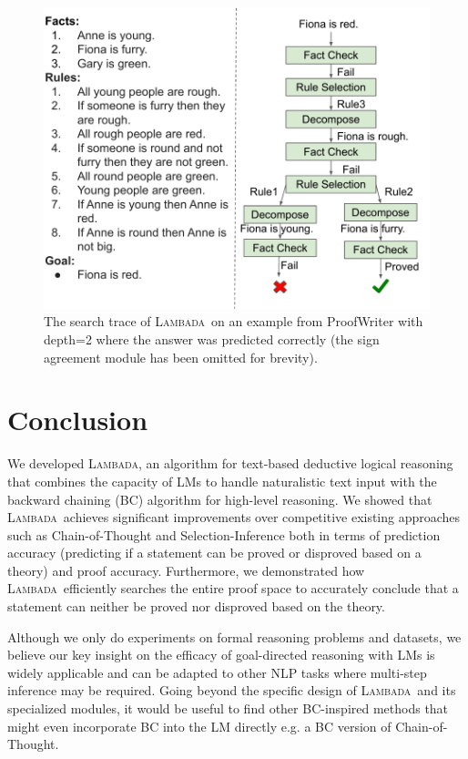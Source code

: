 \documentclass[11pt]{article}
\newcommand{\algo}{\textsc{Lambada}}
\begin{document}
\begin{figure}[t]
  \centering
  \includegraphics[width=\columnwidth]{success1.pdf}
  \caption{%
  \label{fig:success1} %
    The search trace of \algo\ on an example from ProofWriter with depth=2 where the answer was predicted correctly (the sign agreement module has been omitted for brevity).
  }
\end{figure}

\section{Conclusion}
We developed \algo, an algorithm for text-based deductive logical reasoning that combines the capacity of LMs to handle naturalistic text input with the backward chaining (BC) algorithm for high-level reasoning. We showed that \algo\ achieves significant improvements over competitive existing approaches such as Chain-of-Thought and Selection-Inference both in terms of prediction accuracy (predicting if a statement can be proved or disproved based on a theory) and proof accuracy. Furthermore, we demonstrated how \algo\ efficiently searches the entire proof space to accurately conclude that a statement can neither be proved nor disproved based on the theory. 

Although we only do experiments on formal reasoning problems and datasets, we believe our key insight on the efficacy of goal-directed reasoning with LMs is widely applicable and can be adapted to other NLP tasks where multi-step inference may be required. Going beyond the specific design of \algo\ and its specialized modules, it would be useful to find other BC-inspired methods that might even incorporate BC into the LM directly e.g. a BC version of Chain-of-Thought. 
\end{document}
